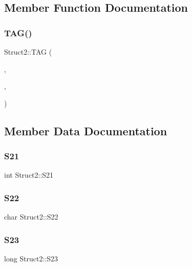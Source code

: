 \subsection{Member Function Documentation}
\mbox{\label{structStruct2_ae6896a66fa6c6f48393847aed8977521}} 
\subsubsection{\texorpdfstring{T\+A\+G()}{TAG()}}
{\footnotesize\ttfamily Struct2\+::\+T\+AG (\begin{DoxyParamCaption}\item[{Struct\+Item1}]{,  }\item[{Struct\+Item2\+:\+Id}]{,  }\item[{Struct\+Item3\+:\char`\"{}Some String\char`\"{}}]{ }\end{DoxyParamCaption})}



\subsection{Member Data Documentation}
\mbox{\label{structStruct2_ab05c5f39fc72694124f782d656ded3a0}} 
\subsubsection{\texorpdfstring{S21}{S21}}
{\footnotesize\ttfamily int Struct2\+::\+S21}

\mbox{\label{structStruct2_af5f7e7a2c7b3372c2fa25f8e823af21e}} 
\subsubsection{\texorpdfstring{S22}{S22}}
{\footnotesize\ttfamily char Struct2\+::\+S22}

\mbox{\label{structStruct2_aa36023d5272e4916a86174b83f384abc}} 
\subsubsection{\texorpdfstring{S23}{S23}}
{\footnotesize\ttfamily long Struct2\+::\+S23}

